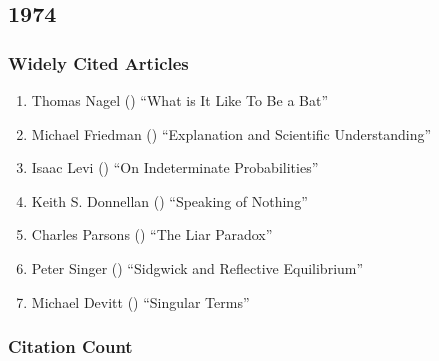 \documentclass[
  10pt,
  letterpaper,
  DIV=11,
  numbers=noendperiod,
  twoside]{scrartcl}
\providecommand{\tightlist}{%
  \setlength{\itemsep}{0pt}\setlength{\parskip}{0pt}}\usepackage{longtable,booktabs,array}
\begin{document}
\newpage

\subsection{1974}\label{sec-s1974}

\subsubsection*{Widely Cited Articles}\label{widely-cited-articles-17}

\begin{enumerate}
\def\labelenumi{\arabic{enumi}.}
\tightlist
\item
  Thomas Nagel () ``What is It
  Like To Be a Bat''
\item
  Michael Friedman () ``Explanation
  and Scientific Understanding''
\item
  Isaac Levi () ``On Indeterminate
  Probabilities''
\item
  Keith S. Donnellan ()
  ``Speaking of Nothing''
\item
  Charles Parsons () ``The Liar
  Paradox''
\item
  Peter Singer () ``Sidgwick and
  Reflective Equilibrium''
\item
  Michael Devitt () ``Singular
  Terms''
\end{enumerate}

\subsubsection*{Citation Count}\label{sec-count-1974}
\end{document}
